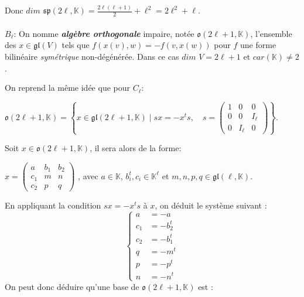 \documentclass[a4paper,openany,12pt]{report}
\newcommand{\KK}{\mathbb{K}}
\newcommand{\gl}{\mathfrak{gl}}
\newcommand{\ssp}{\mathfrak{sp}}
\newcommand{\oo}{\mathfrak{o}}
\theoremstyle{break}
{\theorembodyfont{\upshape}
\newtheorem*{rmq}{Remarque :}
\newtheorem*{prv}{Preuve :}
\newtheorem*{ex}{Exemples :}
\newtheorem*{exe}{Exemple : }
\newtheorem*{nota}{Notation :}
\newtheorem*{dem}{D\'emonstration :}}
\begin{document}
Donc $dim$ $\ssp(2\ell,\KK) = \frac{2\ell(\ell+1)}{2} +\ell^2 = 2\ell^2+ \ell $.\\
\\
$ B_{\ell} $: On nomme \emph{\textbf{algèbre orthogonale}} impaire, notée  $\oo(2\ell+1,\KK)$, l'ensemble des $x \in \gl(V)$ tels que $f(x(v),w)=-f(v,x(w))$ pour $f$ une forme bilinéaire \textit{symétrique} non-dégénérée. Dans ce cas $dim$ $V=2\ell+1$ et $car(\KK) \ne 2$.

On reprend la même idée que pour $ C_{\ell} $:
\begin{center}
$\oo(2\ell+1,\KK)= \left \{ x \in \gl(2\ell+1, \KK) \mid sx= -x^ts,\quad s = \begin{pmatrix} 1 & 0 & 0 \\ 0 & 0 & I_\ell \\ 0 & I_\ell & 0 \end{pmatrix} \right \}$.
\end{center}

Soit $x \in \oo(2 \ell +1, \KK)$, il sera alors de la forme:
\begin{center}
$x = 
\begin{pmatrix}
a & b_{1} & b_{2} \\
c_{1} & m & n \\
c_{2} & p & q 
\end{pmatrix} $
, avec $a \in \KK$, $b_{i}^t,c_{i} \in \KK^{\ell}$ et $m,n,p,q \in \gl(\ell,\KK)$.
\end{center}

En appliquant la condition $sx = -x^ts$ à $x$, on déduit le système suivant :
\[ \left \{
\begin{aligned}
a & = -a \\
c_{1} & = -b_{2}^t \\
c_{2} & = -b_{1}^t \\
q & = -m^t \\
p & = -p^t \\
n & = -n^t
\end{aligned}
\right. \]
On peut donc déduire qu'une base de $\oo(2\ell+1,\KK)$ est :
\end{document}
